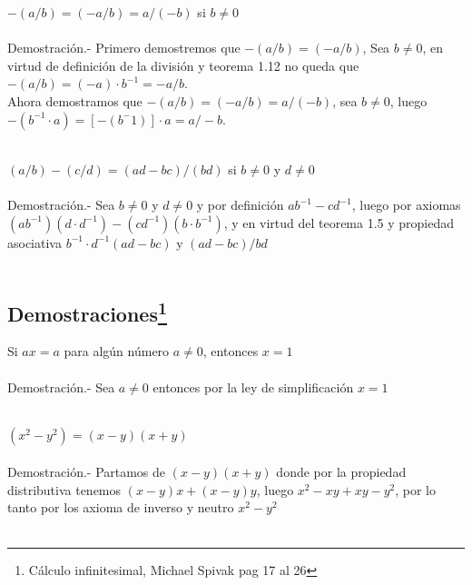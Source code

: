 \begin{teo}
$-(a/b)=(-a/b)=a/(-b)$ si $b\neq 0$\\\\
Demostración.- \;
Primero demostremos que $-(a/b)=(-a/b)$, Sea $b\neq 0$, en virtud de definición de la división y teorema 1.12 no queda que $-(a/b)=(-a)\cdot b^{-1}=-a/b$.\\
Ahora demostramos que $-(a/b)=(-a/b)=a/(-b)$, sea $b\neq0$, luego $-(b^{-1}\cdot a)=\left[-(b^-1)\right]\cdot a = a/-b$. \\\\
\end{teo}

\begin{teo}
$(a/b)-(c/d)=(ad-bc)/(bd)$ si $b\neq 0$ y $d\neq 0$\\\\
Demostración.- \;
Sea $b\neq 0$ y $d\neq 0$ y por definición $ab^{-1}-cd^{-1}$, luego por axiomas $(ab^{-1})(d\cdot d^{-1})-(cd^{-1})(b\cdot b^{-1})$, y en virtud del teorema 1.5 y propiedad asociativa $b^{-1}\cdot d^{-1}(ad-bc)$ y $(ad-bc)/bd$\\\\
\end{teo}




\subsection[Demostraciones]{Demostraciones\footnote{Cálculo infinitesimal, Michael Spivak pag 17 al 26}}
\begin{teo}
Si $ax=a$ para algún número $a\neq 0$, entonces $x=1$\\\\
Demostración.- \;
Sea $a\neq 0$ entonces por la ley de simplificación $x=1$\\\\
\end{teo}

\begin{teo}
$(x^2-y^2)=(x-y)(x+y)$\\\\
Demostración.- \;
Partamos de $(x-y)(x+y)$ donde por la propiedad distributiva tenemos $(x-y)x+(x-y)y$, luego $x^2-xy+xy-y^2$, por lo tanto por los axioma  de inverso y  neutro $x^2-y^2$\\\\ 
\end{teo}

